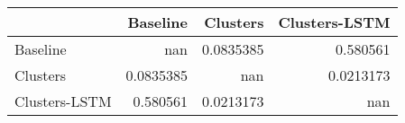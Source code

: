 \begin{tabular}{lrrr}
\toprule
               &    Baseline &    Clusters &   Clusters-LSTM \\
\midrule
 Baseline      & nan         &   0.0835385 &       0.580561  \\
 Clusters      &   0.0835385 & nan         &       0.0213173 \\
 Clusters-LSTM &   0.580561  &   0.0213173 &     nan         \\
\bottomrule
\end{tabular}